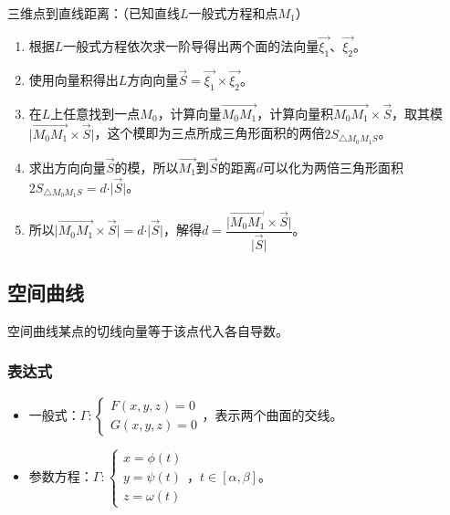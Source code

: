 \documentclass[UTF8, 12pt]{ctexart}
\begin{document}
        三维点到直线距离：（已知直线$L$一般式方程和点$M_1$）

        \begin{enumerate}
            \item 根据$L$一般式方程依次求一阶导得出两个面的法向量$\vec{\xi_1}$、$\vec{\xi_2}$。
            \item 使用向量积得出$L$方向向量$\vec{S}=\vec{\xi_1}\times\vec{\xi_2}$。
            \item 在$L$上任意找到一点$M_0$，计算向量$\overrightarrow{M_0M_1}$，计算向量积$\overrightarrow{M_0M_1}\times\vec{S}$，取其模$\vert\overrightarrow{M_0M_1}\times\vec{S}\vert$，这个模即为三点所成三角形面积的两倍$2S_{\triangle M_0M_1S}$。
            \item 求出方向向量$\vec{S}$的模，所以$\vec{M_1}$到$\vec{S}$的距离$d$可以化为两倍三角形面积$2S_{\triangle M_0M_1S}=d\cdot\vert\vec{S}\vert$。
            \item 所以$\vert\overrightarrow{M_0M_1}\times\vec{S}\vert=d\cdot\vert\vec{S}\vert$，解得$d=\dfrac{\vert\overrightarrow{M_0M_1}\times\vec{S}\vert}{\vert\vec{S}\vert}$。
        \end{enumerate}

        \subsection{空间曲线}

        空间曲线某点的切线向量等于该点代入各自导数。

        \subsubsection{表达式}

        \begin{itemize}
            \item 一般式：$\varGamma:\left\{\begin{array}{l}
                                               F(x,y,z)=0 \\
                                               G(x,y,z)=0
            \end{array}\right.$，表示两个曲面的交线。
            \item 参数方程：$\varGamma:\left\{\begin{array}{l}
                                                 x=\phi(t) \\
                                                 y=\psi(t) \\
                                                 z=\omega(t)
            \end{array}\right.$，$t\in[\alpha,\beta]$。
        \end{itemize}
\end{document}
